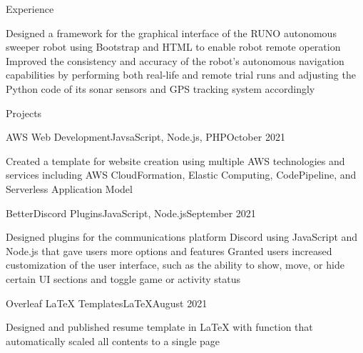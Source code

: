 \documentclass[11pt]{cv_template}
\begin{document}
\begin{cv}
\begin{cvsection}{Experience}
\begin{cvsubsection}
\listitem Designed a framework for the graphical interface of the RUNO autonomous sweeper robot using Bootstrap and HTML to enable robot remote operation
\listitem Improved the consistency and accuracy of the robot's autonomous navigation capabilities by performing both real-life and remote trial runs and adjusting the Python code of its sonar sensors and GPS tracking system accordingly

\end{cvsubsection}


\end{cvsection}


\begin{cvsection}{Projects}


\begin{cvsubsection}
{AWS Web Development}{JavsaScript, Node.js, PHP}{October 2021}{}

\listitem Created a template for website creation using multiple AWS technologies and services including AWS CloudFormation, Elastic Computing, CodePipeline, and Serverless Application Model

\end{cvsubsection}


\begin{cvsubsection}
{BetterDiscord Plugins}{JavaScript, Node.js}{September 2021}{}

\listitem Designed plugins for the communications platform Discord using JavaScript and Node.js that gave users more options and features
\listitem Granted users increased customization of the user interface, such as the ability to show, move, or hide certain UI sections and toggle game or activity status

\end{cvsubsection}


\begin{cvsubsection}
{Overleaf LaTeX Templates}{LaTeX}{August 2021}{}

\listitem Designed and published resume template in LaTeX with function that automatically scaled all contents to a single page


\end{cvsubsection}
\end{cvsection}
\end{cv}
\end{document}
